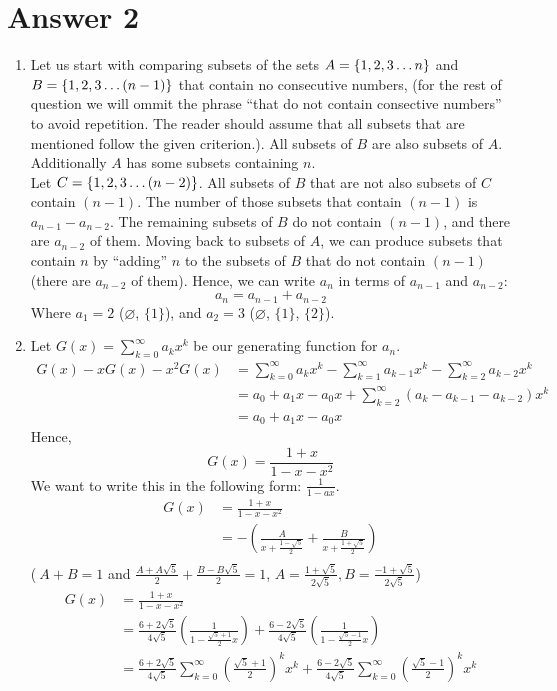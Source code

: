 \documentclass[12pt]{article}
\begin{document}
\section*{Answer 2}
\begin{enumerate}[label=\alph*)]
	
	\item{} 
		Let us start with comparing subsets of the sets $A=\{1,2,3\mathellipsis n\}$ and $B=\{1,2,3\mathellipsis (n-1)\}$ that contain no consecutive numbers, (for the rest of question we will ommit the phrase ``that do not contain consective numbers'' to avoid repetition. The reader should assume that all subsets that are mentioned follow the given criterion.). All subsets of $B$ are also subsets of $A$. Additionally $A$ has some subsets containing $n$.\\

Let $C=\{1,2,3\mathellipsis (n-2)\}$. All subsets of $B$ that are not also subsets of $C$ contain $(n-1)$. The number of those subsets that contain $(n-1)$ is $a_{n-1} - a_{n-2}$. The remaining subsets of $B$ do not contain $(n-1)$, and there are $a_{n-2}$ of them. Moving back to subsets of $A$, we can produce subsets that contain $n$ by ``adding'' $n$ to the subsets of $B$ that do not contain $(n-1)$ (there are $a_{n-2}$ of them). Hence, we can write $a_n$ in terms of $a_{n-1}$ and $a_{n-2}$: \[a_n=a_{n-1}+a_{n-2}\]
		Where $a_1 = 2$ ($\varnothing$, $\{1\}$), and $a_2 = 3$ ($\varnothing$, $\{1\}$, $\{2\}$).
	\item
		Let $G(x) = \sum_{k=0}^\infty a_kx^k$ be our generating function for $a_n$.
		\begin{align*}
			G(x) - xG(x) - x^2G(x) &= \sum_{k=0}^\infty a_kx^k-\sum_{k=1}^\infty a_{k-1}x^k - \sum_{k=2}^\infty a_{k-2}x^k\\
			&= a_0 + a_1x - a_0x + \sum_{k=2}^\infty(a_k - a_{k-1} -a_{k-2})x^k\\
			&= a_0 + a_1x - a_0x 
		\end{align*}
		Hence, \[G(x) = \frac{1+x}{1-x-x^2}\] We want to write this in the following form: $\frac{1}{1-ax}$.\\
		\begin{align*}
			G(x) &= \frac{1+x}{1-x-x^2}\\
			&= -\left(\frac{A}{x+\frac{1-\sqrt{5}}{2}} + \frac{B}{x+\frac{1+\sqrt{5}}{2}}\right)\\
		\end{align*}
		\center($\ A+B=1$ and $\frac{A+A\sqrt{5}}{2} + \frac{B-B\sqrt{5}}{2} = 1$, $A=\frac{1+\sqrt{5}}{2\sqrt{5}},B=\frac{-1+\sqrt{5}}{2\sqrt{5}}$)
		\begin{align*}
			G(x) &= \frac{1+x}{1-x-x^2}\\
			&= \frac{6+2\sqrt{5}}{4\sqrt{5}} \left(\frac{1}{1-\frac{\sqrt{5}+1}{2}x}\right)+\frac{6-2\sqrt{5}}{4\sqrt{5}}\left(\frac{1}{1-\frac{\sqrt{5}-1}{2}x}\right)\\
			&= \frac{6+2\sqrt{5}}{4\sqrt{5}} \sum_{k=0}^\infty {\left(\frac{\sqrt{5}+1}{2}\right)^kx^k}+ \frac{6-2\sqrt{5}}{4\sqrt{5}} \sum_{k=0}^\infty\left(\frac{\sqrt{5}-1}{2}\right)^kx^k\\
		\end{align*}
\end{enumerate}
\end{document}
